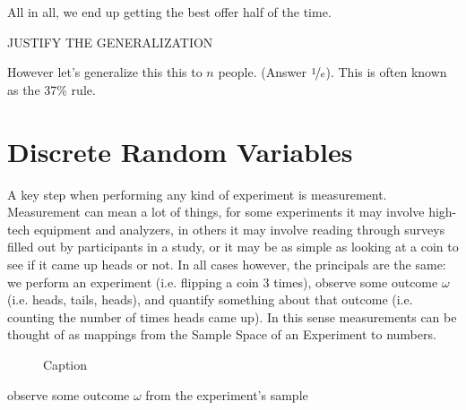 \documentclass{report}
\begin{document}
\\\\

All in all, we end up getting the best offer half of the time.

\todo JUSTIFY THE GENERALIZATION

However let's generalize this this to $n$ people. (Answer $\nicefrac 1e$). This is often known as the 37\% rule. 


\section{Discrete Random Variables}
A key step when performing any kind of experiment is measurement. Measurement can mean a lot of things, for some experiments it may involve high-tech equipment and analyzers, in others it may involve reading through surveys filled out by participants in a study, or it may be as simple as looking at a coin to see if it came up heads or not. In all cases however, the principals are the same: we perform an experiment (i.e. flipping a coin 3 times), observe some outcome $\omega$ (i.e. heads, tails, heads), and quantify something about that outcome (i.e. counting the number of times heads came up). In this sense measurements can be thought of as mappings from the Sample Space of an Experiment to numbers.

\begin{figure}
    \centering
    
    \caption{Caption}
    \label{fig:my_label}
\end{figure}

\newpage


observe some outcome $\omega$ from the experiment's sample 
\end{document}
